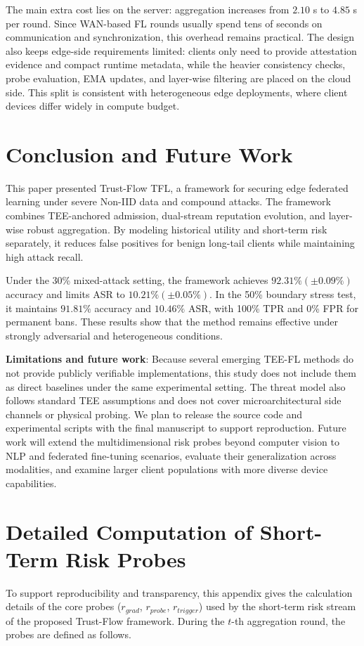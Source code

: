 \documentclass[final,5p,times,twocolumn]{elsarticle/elsarticle}
\begin{document}
The main extra cost lies on the server: aggregation increases from $2.10$ s to $4.85$ s per round. Since WAN-based FL rounds usually spend tens of seconds on communication and synchronization, this overhead remains practical. The design also keeps edge-side requirements limited: clients only need to provide attestation evidence and compact runtime metadata, while the heavier consistency checks, probe evaluation, EMA updates, and layer-wise filtering are placed on the cloud side. This split is consistent with heterogeneous edge deployments, where client devices differ widely in compute budget.

\section{Conclusion and Future Work}
This paper presented Trust-Flow TFL, a framework for securing edge federated learning under severe Non-IID data and compound attacks. The framework combines TEE-anchored admission, dual-stream reputation evolution, and layer-wise robust aggregation. By modeling historical utility and short-term risk separately, it reduces false positives for benign long-tail clients while maintaining high attack recall.

Under the 30\% mixed-attack setting, the framework achieves $92.31\% (\pm 0.09\%)$ accuracy and limits ASR to $10.21\% (\pm 0.05\%)$. In the 50\% boundary stress test, it maintains $91.81\%$ accuracy and $10.46\%$ ASR, with 100\% TPR and 0\% FPR for permanent bans. These results show that the method remains effective under strongly adversarial and heterogeneous conditions.

\textbf{Limitations and future work}: Because several emerging TEE-FL methods do not provide publicly verifiable implementations, this study does not include them as direct baselines under the same experimental setting. The threat model also follows standard TEE assumptions and does not cover microarchitectural side channels or physical probing. We plan to release the source code and experimental scripts with the final manuscript to support reproduction. Future work will extend the multidimensional risk probes beyond computer vision to NLP and federated fine-tuning scenarios, evaluate their generalization across modalities, and examine larger client populations with more diverse device capabilities.

\appendix
\section{Detailed Computation of Short-Term Risk Probes}
To support reproducibility and transparency, this appendix gives the calculation details of the core probes ($r_{grad}$, $r_{probe}$, $r_{trigger}$) used by the short-term risk stream of the proposed Trust-Flow framework. During the $t$-th aggregation round, the probes are defined as follows.
\end{document}
